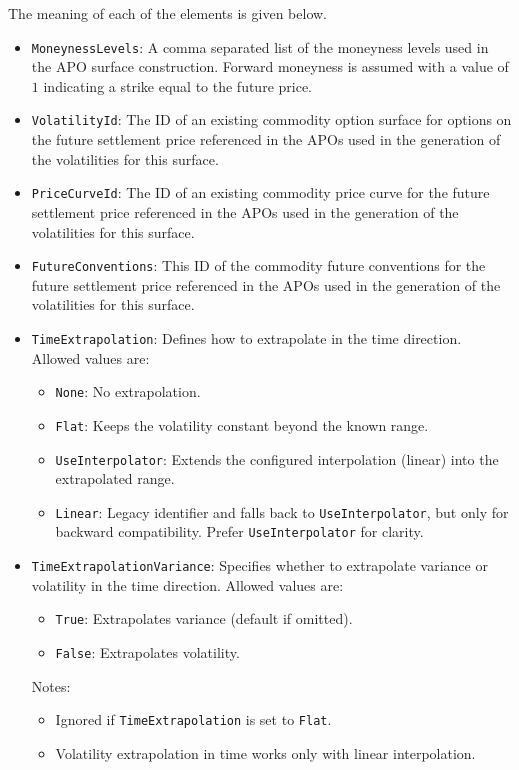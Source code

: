 The meaning of each of the elements is given below.
\begin{itemize}
\item \lstinline!MoneynessLevels!:
A comma separated list of the moneyness levels used in the APO surface construction. Forward moneyness is assumed with a value of $1$ indicating a strike equal to the future price.

\item \lstinline!VolatilityId!:
The ID of an existing commodity option surface for options on the future settlement price referenced in the APOs used in the generation of the volatilities for this surface.

\item \lstinline!PriceCurveId!:
The ID of an existing commodity price curve for the future settlement price referenced in the APOs used in the generation of the volatilities for this surface.

\item \lstinline!FutureConventions!:
This ID of the commodity future conventions for the future settlement price referenced in the APOs used in the generation of the volatilities for this surface.

\item \lstinline!TimeExtrapolation!:
Defines how to extrapolate in the time direction. Allowed values are:
  \begin{itemize}
    \item \lstinline!None!: No extrapolation.
    \item \lstinline!Flat!: Keeps the volatility constant beyond the known range.
    \item \lstinline!UseInterpolator!: Extends the configured interpolation (linear) into the extrapolated range.
    \item \lstinline!Linear!: Legacy identifier and falls back to \lstinline!UseInterpolator!, but only for backward compatibility. Prefer \lstinline!UseInterpolator! for clarity.
  \end{itemize}

\item \lstinline!TimeExtrapolationVariance!:
Specifies whether to extrapolate variance or volatility in the time direction. Allowed values are:
  \begin{itemize}
    \item \lstinline!True!: Extrapolates variance (default if omitted).
    \item \lstinline!False!: Extrapolates volatility.
  \end{itemize}
  Notes:
  \begin{itemize}
    \item Ignored if \lstinline!TimeExtrapolation! is set to \lstinline!Flat!.
    \item Volatility extrapolation in time works only with linear interpolation.
  \end{itemize}


\end{itemize}

